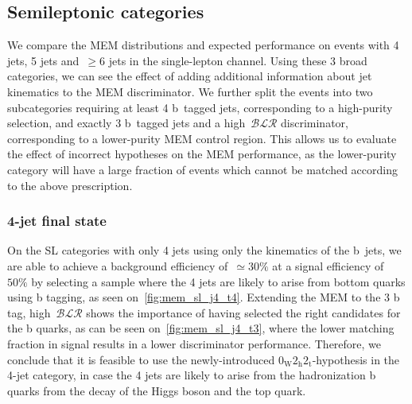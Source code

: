 \subsection{Semileptonic categories}
We compare the MEM distributions and expected performance on events with 4 jets, 5 jets and~$\ge6$ jets in the single-lepton channel. Using these 3 broad categories, we can see the effect of adding additional information about jet kinematics to the MEM discriminator. We further split the events into two subcategories requiring at least 4 b~tagged jets, corresponding to a high-purity selection, and exactly 3 b~tagged jets and a high~$\mathcal{BLR}$ discriminator, corresponding to a lower-purity MEM control region. This allows us to evaluate the effect of incorrect hypotheses on the MEM performance, as the lower-purity category will have a large fraction of events which cannot be matched according to the above prescription. 

\subsubsection{4-jet final state}
On the SL categories with only 4 jets using only the kinematics of the b~jets, we are able to achieve a background efficiency of~$\simeq 30\%$ at a signal efficiency of~$50\%$ by selecting a sample where the 4 jets are likely to arise from bottom quarks using b tagging, as seen on~\cref{fig:mem_sl_j4_t4}. Extending the MEM to the 3 b tag, high~$\mathcal{BLR}$ shows the importance of having selected the right candidates for the b quarks, as can be seen on~\cref{fig:mem_sl_j4_t3}, where the lower matching fraction in signal results in a lower discriminator performance. Therefore, we conclude that it is feasible to use the newly-introduced $0_{\mathrm{W}} 2_{\mathrm{h}} 2_{\mathrm{t}}$-hypothesis in the 4-jet category, in case the 4 jets are likely to arise from the hadronization b quarks from the decay of the Higgs boson and the top quark.

